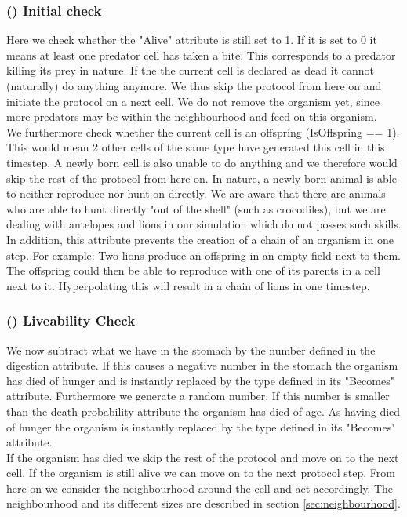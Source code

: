 \documentclass[11pt]{article}
\begin{document}
\subsubsection{() Initial check} 
Here we check whether the "Alive" attribute is still set to 1. If it is set to 0 it means at least one predator cell has taken a bite. This corresponds to a predator killing its prey in nature. If the the current cell is declared as dead it cannot (naturally) do anything anymore. We thus skip the protocol from here on and initiate the protocol on a next cell. We do not remove the organism yet, since more predators may be within the neighbourhood and feed on this organism.
\\We furthermore check whether the current cell is an offspring (IsOffspring == 1). This would mean 2 other cells of the same type have generated this cell in this timestep. A newly born cell is also unable to do anything and we therefore would skip the rest of the protocol from here on. In nature, a newly born animal is able to neither reproduce nor hunt on directly. We are aware that there are animals who are able to hunt directly "out of the shell" (such as crocodiles), but we are dealing with antelopes and lions in our simulation which do not posses such skills. In addition, this attribute prevents the creation of a chain of an organism in one step. For example: Two lions produce an offspring in an empty field next to them. The offspring could then be able to reproduce with one of its parents in a cell next to it. Hyperpolating this will result in a chain of lions in one timestep.

\addtocounter{protocolCounter}{1}
\label{tab:reproduction}
\subsubsection{() Liveability Check} 
We now subtract what we have in the stomach by the number defined in the digestion attribute. If this causes a negative number in the stomach the organism has died of hunger and is instantly replaced by the type defined in its "Becomes" attribute. Furthermore we generate a random number. If this number is smaller than the death probability attribute the organism has died of age. As having died of hunger the organism is instantly replaced by the type defined in its "Becomes" attribute.\\
If the organism has died we skip the rest of the protocol and move on to the next cell. If the organism is still alive we can move on to the next protocol step. From here on we consider the neighbourhood around the cell and act accordingly. The neighbourhood and its different sizes are described in section \ref{sec:neighbourhood}.
\end{document}
